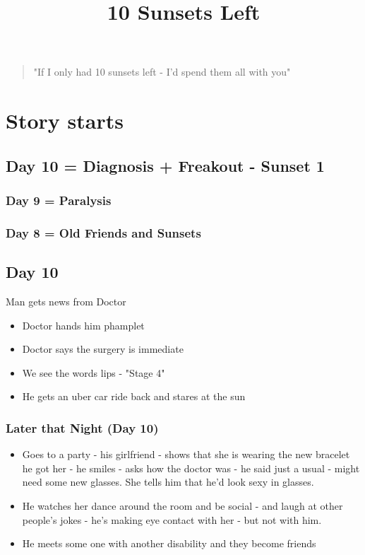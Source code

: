 \documentclass{article}
\begin{document}
\title{10 Sunsets Left}
\maketitle

\begin{quote}
"If I only had 10 sunsets left - I'd spend them all with you"
\end{quote}

\section*{Story starts}

\subsection*{Day 10 = Diagnosis + Freakout - Sunset 1}

\subsubsection*{Day 9 = Paralysis}
\subsubsection*{Day 8 = Old Friends and Sunsets}

\subsection*{Day 10}
Man gets news from Doctor 
\begin{itemize}
\item Doctor hands him phamplet
\item Doctor says the surgery is immediate
\item We see the words lips - "Stage 4"
\item He gets an uber car ride back and stares at the sun 
\end{itemize}

\subsubsection*{Later that Night (Day 10)}
\begin{itemize}
\item Goes to a party - his girlfriend - shows that she is wearing the new bracelet he got her - he smiles - asks how the doctor was - he said just a usual - might need some new glasses. She tells him that he'd look sexy in glasses.
\item He watches her dance around the room and be social - and laugh at other people's jokes - he's making eye contact with her - but not with him.
\item He meets some one with another disability and they become friends 
\end{itemize}
\end{document}
